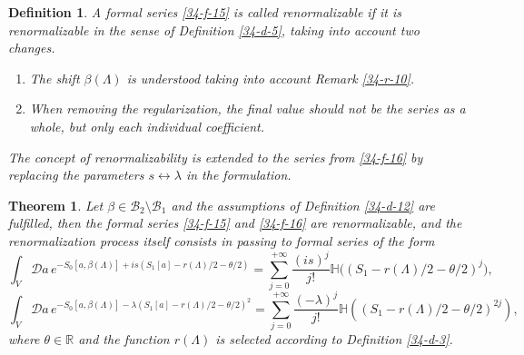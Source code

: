 \documentclass[a4paper]{article}
\newtheorem{theorem}{Theorem}
\newtheorem{deff}{Definition}
\begin{document}
\begin{deff}\label{34-d-13}
A formal series \eqref{34-f-15} is called renormalizable if it is renormalizable in the sense of Definition \ref{34-d-5}, taking into account two changes.
\begin{enumerate}
	\item The shift $\beta(\Lambda)$ is understood taking into account Remark \ref{34-r-10}.
	\item When removing the regularization, the final value should not be the series as a whole, but only each individual coefficient.
\end{enumerate}
The concept of renormalizability is extended to the series from \eqref{34-f-16} by replacing the parameters $s\leftrightarrow\lambda$ in the formulation.
\end{deff}
\begin{theorem}\label{34-t-3}
Let $\beta\in\mathcal{B}_2\setminus\mathcal{B}_1$ and the assumptions of Definition \ref{34-d-12} are fulfilled, then the formal series \eqref{34-f-15} and \eqref{34-f-16} are renormalizable, and the renormalization process itself consists in passing to formal series of the form
\begin{equation}\label{34-f-17}
	\int_V\mathcal{D}a\,e^{-S_0[a,\beta(\Lambda)]+is(S_1[a]-r(\Lambda)/2-\theta/2)}=
	\sum_{j=0}^{+\infty}\frac{(is)^j}{j!}\mathbb{H}\big((S_1-r(\Lambda)/2-\theta/2)^j\big),
\end{equation}
\begin{equation}\label{34-f-18}
	\int_V\mathcal{D}a\,e^{-S_0[a,\beta(\Lambda)]-\lambda (S_1[a]-r(\Lambda)/2-\theta/2)^2}=
	\sum_{j=0}^{+\infty}\frac{(-\lambda)^j}{j!}\mathbb{H}((S_1-r(\Lambda)/2-\theta/2)^{2j}),
\end{equation}
where $\theta\in\mathbb{R}$ and the function $r(\Lambda)$ is selected according to Definition \ref{34-d-3}.
\end{theorem}
\end{document}
